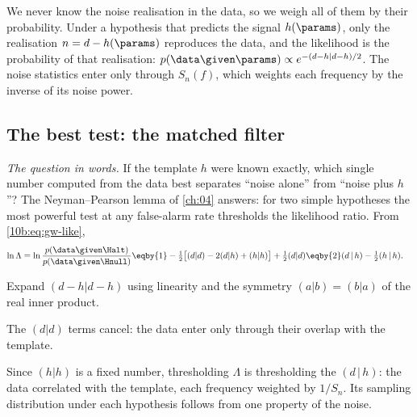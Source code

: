 \begin{keyidea}
We never know the noise realisation in the data, so we weigh all of them by their probability. Under a hypothesis
that predicts the signal $h(\params)$, only the realisation $n=d-h(\params)$ reproduces the data, and the
likelihood is the probability of that realisation: $p(\data\given\params)\propto e^{-(d-h|d-h)/2}$. The noise
statistics enter only through $S_n(f)$, which weights each frequency by the inverse of its noise power.
\end{keyidea}

\subsection{The best test: the matched filter}
\label{10b:sec:matched-filter}

\emph{The question in words.} If the template $h$ were known exactly, which single number computed from the data
best separates ``noise alone'' from ``noise plus $h$''? The Neyman--Pearson lemma of \cref{ch:04} answers: for two
simple hypotheses the most powerful test at any false-alarm rate thresholds the likelihood ratio. From
\eqref{10b:eq:gw-like},
\begin{align}
  \ln\Lambda
  =\ln\frac{p(\data\given\Halt)}{p(\data\given\Hnull)}
  &\eqby{1}-\tfrac12\big[(d|d)-2(d|h)+(h|h)\big]+\tfrac12(d|d)
  \eqby{2}(d\,|\,h)-\tfrac12(h\,|\,h).
  \label{10b:eq:lr}
\end{align}
\begin{explain}
  \item Expand $(d-h|d-h)$ using linearity and the symmetry $(a|b)=(b|a)$ of the real inner product.
  \item The $(d|d)$ terms cancel: the data enter only through their overlap with the template.
\end{explain}
Since $(h|h)$ is a fixed number, thresholding $\Lambda$ is thresholding the  $(d\,|\,h)$: the
data correlated with the template, each frequency weighted by $1/S_n$. Its sampling distribution under each
hypothesis follows from one property of the noise.

